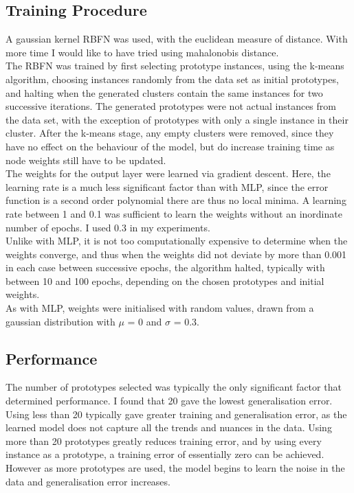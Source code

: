 \documentclass{article}
\begin{document}
\subsection*{Training Procedure}
\noindent A gaussian kernel RBFN was used, with the euclidean measure of distance. With more time I would like to have tried using mahalonobis distance. \\
\indent The RBFN was trained by first selecting prototype instances, using the k-means algorithm, choosing instances randomly from the data set as initial prototypes, and halting when the generated clusters contain the same instances for two successive iterations. The generated prototypes were not actual instances from the data set, with the exception of prototypes with only a single instance in their cluster. After the k-means stage, any empty clusters were removed, since they have no effect on the behaviour of the model, but do increase training time as node weights still have to be updated. \\
\indent The weights for the output layer were learned via gradient descent. Here, the learning rate is a much less significant factor than with MLP, since the error function is a second order polynomial there are thus no local minima. A learning rate between 1 and 0.1 was sufficient to learn the weights without an inordinate number of epochs. I used 0.3 in my experiments. \\
\indent Unlike with MLP, it is not too computationally expensive to determine when the weights converge, and thus when the weights did not deviate by more than 0.001 in each case between successive epochs, the algorithm halted, typically with between 10 and 100 epochs, depending on the chosen prototypes and initial weights. \\
\indent As with MLP, weights were initialised with random values, drawn from a gaussian distribution with $\mu$ = 0 and $\sigma$ = 0.3. \\
\subsection*{Performance}
The number of prototypes selected was typically the only significant factor that determined performance. I found that 20 gave the lowest generalisation error. Using less than 20 typically gave greater training and generalisation error, as the learned model does not capture all the trends and nuances in the data. Using more than 20 prototypes greatly reduces training error, and by using every instance as a prototype, a training error of essentially zero can be achieved. However as more prototypes are used, the model begins to learn the noise in the data and generalisation error increases.
\end{document}
